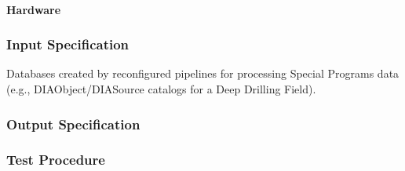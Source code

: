 \paragraph{Hardware}

\subsubsection{Input Specification}
Databases created by reconfigured pipelines for processing Special
Programs data (e.g., DIAObject/DIASource catalogs for a Deep Drilling
Field).


\subsubsection{Output Specification}

\subsubsection{Test Procedure}

